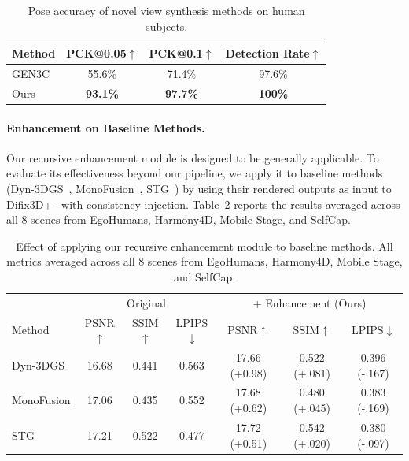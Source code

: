 \documentclass[acmtog]{acmart}
\begin{document}
\begin{table}[tbp]
\centering
\caption{Pose accuracy of novel view synthesis methods on human subjects.}
\label{tab:pck}
\begin{tabular}{l|cc|c}
\toprule
Method & PCK@0.05$\uparrow$ & PCK@0.1$\uparrow$ & Detection Rate$\uparrow$ \\
\midrule
GEN3C & 55.6\% & 71.4\% & 97.6\% \\
Ours & \textbf{93.1\%} & \textbf{97.7\%} & \textbf{100\%} \\
\bottomrule
\end{tabular}

\end{table}

\paragraph{Enhancement on Baseline Methods.}
Our recursive enhancement module is designed to be generally applicable. To evaluate its effectiveness beyond our pipeline, we apply it to baseline methods (Dyn-3DGS~\cite{luiten2024dynamic}, MonoFusion~\cite{wang2025monofusion}, STG~\cite{li2024spacetime}) by using their rendered outputs as input to Difix3D+~\cite{wu2025difix3d+} with consistency injection. Table~\ref{tab:enhance_baselines} reports the results averaged across all 8 scenes from EgoHumans, Harmony4D, Mobile Stage, and SelfCap.

\begin{table}[tbp]
\centering
\caption{Effect of applying our recursive enhancement module to baseline methods. All metrics averaged across all 8 scenes from EgoHumans, Harmony4D, Mobile Stage, and SelfCap.}
\label{tab:enhance_baselines}
\begin{tabular}{l|ccc|ccc}
\toprule
& \multicolumn{3}{c|}{Original} & \multicolumn{3}{c}{+ Enhancement (Ours)} \\
Method & PSNR$\uparrow$ & SSIM$\uparrow$ & LPIPS$\downarrow$ & PSNR$\uparrow$ & SSIM$\uparrow$ & LPIPS$\downarrow$ \\
\midrule
Dyn-3DGS & 16.68 & 0.441 & 0.563 & 17.66 \textcolor{green!50!black}{\scriptsize(+0.98)} & 0.522 \textcolor{green!50!black}{\scriptsize(+.081)} & 0.396 \textcolor{green!50!black}{\scriptsize(-.167)} \\
MonoFusion & 17.06 & 0.435 & 0.552 & 17.68 \textcolor{green!50!black}{\scriptsize(+0.62)} & 0.480 \textcolor{green!50!black}{\scriptsize(+.045)} & 0.383 \textcolor{green!50!black}{\scriptsize(-.169)} \\
STG & 17.21 & 0.522 & 0.477 & 17.72 \textcolor{green!50!black}{\scriptsize(+0.51)} & 0.542 \textcolor{green!50!black}{\scriptsize(+.020)} & 0.380 \textcolor{green!50!black}{\scriptsize(-.097)} \\
\bottomrule
\end{tabular}
\end{table}
\end{document}
